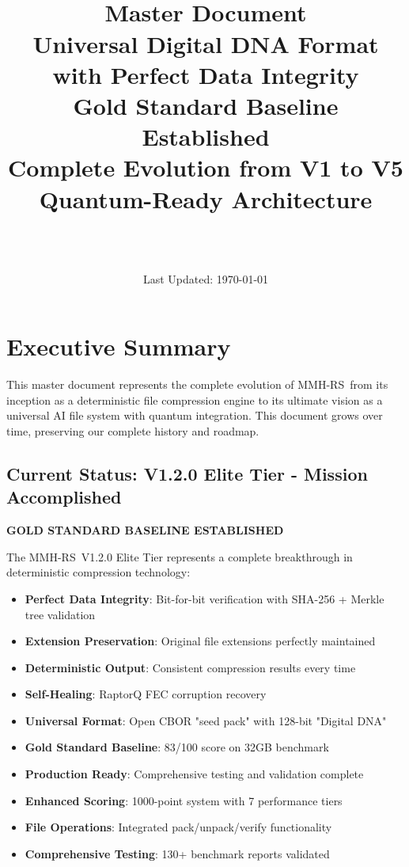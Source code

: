 \documentclass[12pt,a4paper]{article}
\title{\Huge\textbf{\project\ \version}\\[0.5cm]
\Large\textbf{Master Document}\\[0.3cm]
\large Universal Digital DNA Format with Perfect Data Integrity\\[0.5cm]
\large Gold Standard Baseline Established\\[0.3cm]
\large Complete Evolution from V1 to V5\\[0.3cm]
\large Quantum-Ready Architecture}
\author{\Large\authorname\\[0.2cm]\email\\[0.2cm]\github}
\date{\large Last Updated: \today}
\newcommand{\project}{MMH-RS}
\begin{document}
\maketitle
\thispagestyle{empty}

\tableofcontents
\newpage

\section{Executive Summary}

This master document represents the complete evolution of \project\ from its inception as a deterministic file compression engine to its ultimate vision as a universal AI file system with quantum integration. This document grows over time, preserving our complete history and roadmap.

\subsection{Current Status: V1.2.0 Elite Tier - Mission Accomplished}

\textbf{GOLD STANDARD BASELINE ESTABLISHED}

The \project\ V1.2.0 Elite Tier represents a complete breakthrough in deterministic compression technology:

\begin{itemize}
    \item \textbf{Perfect Data Integrity}: Bit-for-bit verification with SHA-256 + Merkle tree validation
    \item \textbf{Extension Preservation}: Original file extensions perfectly maintained
    \item \textbf{Deterministic Output}: Consistent compression results every time
    \item \textbf{Self-Healing}: RaptorQ FEC corruption recovery
    \item \textbf{Universal Format}: Open CBOR "seed pack" with 128-bit "Digital DNA"
    \item \textbf{Gold Standard Baseline}: 83/100 score on 32GB benchmark
    \item \textbf{Production Ready}: Comprehensive testing and validation complete
    \item \textbf{Enhanced Scoring}: 1000-point system with 7 performance tiers
    \item \textbf{File Operations}: Integrated pack/unpack/verify functionality
    \item \textbf{Comprehensive Testing}: 130+ benchmark reports validated
\end{itemize}
\end{document}
